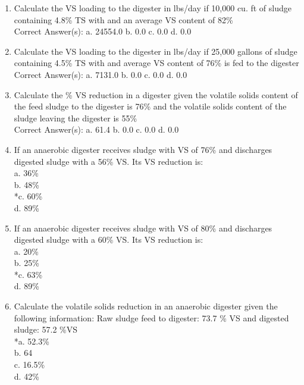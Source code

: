 \documentclass{article}
\begin{document}
\begin{enumerate}
\item  Calculate the VS loading to the digester in lbs/day if 10,000 cu. ft of sludge containing 4.8\% TS with and an average VS content of 82\%\\

Correct Answer(s):
a. 24554.0
b. 0.0
c. 0.0
d. 0.0 \\

\item  Calculate the VS loading to the digester in lbs/day if 25,000 gallons of sludge containing 4.5\% TS with and average VS content of 76\% is fed to the digester\\

Correct Answer(s):
a. 7131.0
b. 0.0
c. 0.0
d. 0.0 \\

\item  Calculate the \% VS reduction in a digester given the volatile solids content of the feed sludge to the digester is 76\% and the volatile solids content of the sludge leaving the digester is 55\%\\

Correct Answer(s):
a. 61.4
b. 0.0
c. 0.0
d. 0.0 \\

\item  If an anaerobic digester receives sludge with VS of 76\% and discharges digested sludge with a 56\% VS.  Its VS reduction is:\\

a. 36\% \\
b. 48\% \\
*c. 60\% \\
d. 89\% \\

\item  If an anaerobic digester receives sludge with VS of 80\% and discharges digested sludge with a 60\% VS.  Its VS reduction is:\\

a. 20\% \\
b. 25\% \\
*c. 63\% \\
d. 89\% \\

\item  Calculate the volatile solids reduction in an anaerobic digester given the following information:  Raw sludge feed to digester:  73.7 \% VS and digested sludge: 57.2 \%VS\\

*a. 52.3\% \\
b. 64 \\
c. 16.5\% \\
d. 42\% \\


\end{enumerate}
\end{document}
